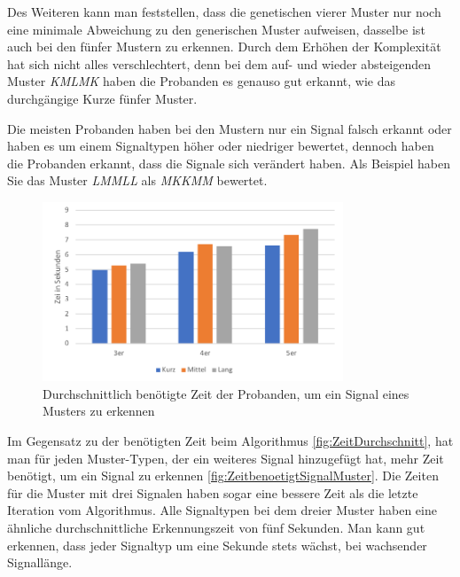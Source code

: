 Des Weiteren kann man feststellen, dass die genetischen vierer Muster nur noch eine minimale Abweichung zu den generischen Muster aufweisen, dasselbe ist auch bei den f{\"u}nfer Mustern zu erkennen.
Durch dem Erh{\"o}hen der Komplexit{\"a}t hat sich nicht alles verschlechtert, denn bei dem auf- und wieder absteigenden Muster \textit{KMLMK} haben die Probanden es genauso gut erkannt, wie das durchg{\"a}ngige Kurze f{\"u}nfer Muster. 

Die meisten Probanden haben bei den Mustern nur ein Signal falsch erkannt oder haben es um einem Signaltypen h{\"o}her oder niedriger bewertet, dennoch haben die Probanden erkannt, dass die Signale sich ver{\"a}ndert haben. Als Beispiel haben Sie das Muster \textit{LMMLL} als \textit{MKKMM} bewertet. \\

\begin{figure}[htbp] 
            \centering
   	\includegraphics[width=0.8\textwidth]{pics/analyse/algo/ZeitbenoetigtSignalMuster.png}
	\caption{Durchschnittlich ben{\"o}tigte Zeit der Probanden, um ein Signal eines Musters zu erkennen}
	\label{fig:ZeitbenoetigtSignalMuster}
\end{figure}

Im Gegensatz zu der ben{\"o}tigten Zeit beim Algorithmus \autoref{fig:ZeitDurchschnitt}, hat man f{\"u}r jeden Muster-Typen, der ein weiteres Signal hinzugef{\"u}gt hat, mehr Zeit ben{\"o}tigt, um ein Signal zu erkennen \autoref{fig:ZeitbenoetigtSignalMuster}. 
Die Zeiten f{\"u}r die Muster mit drei Signalen haben sogar eine bessere Zeit als die letzte Iteration vom Algorithmus. 
Alle Signaltypen bei dem dreier Muster haben eine {\"a}hnliche durchschnittliche Erkennungszeit von f{\"u}nf Sekunden.
Man kann gut erkennen, dass jeder Signaltyp um eine Sekunde stets w{\"a}chst, bei wachsender Signall{\"a}nge.

